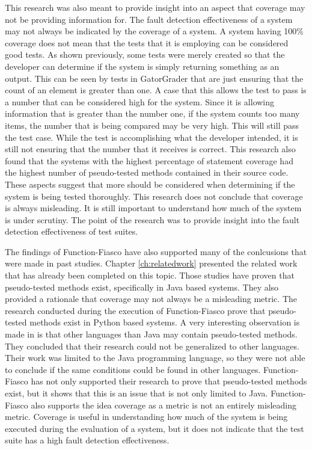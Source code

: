 This research was also meant to provide insight into an aspect that coverage may not be providing information for. The fault detection effectiveness of a system may not always be indicated by the coverage of a system. A system having 100\% coverage does not mean that the tests that it is employing can be considered good tests. As shown previously, some tests were merely created so that the developer can determine if the system is simply returning something as an output. This can be seen by tests in GatorGrader that are just ensuring that the count of an element is greater than one. A case that this allows the test to pass is a number that can be considered high for the system. Since it is allowing information that is greater than the number one, if the system counts too many items, the number that is being compared may be very high. This will still pass the test case. While the test is accomplishing what the developer intended, it is still not ensuring that the number that it receives is correct. This research also found that the systems with the highest percentage of statement coverage had the highest number of pseudo-tested methods contained in their source code. These aspects suggest that more should be considered when determining if the system is being tested thoroughly. This research does not conclude that coverage is always misleading. It is still important to understand how much of the system is under scrutiny. The point of the research was to provide insight into the fault detection effectiveness of test suites.

The findings of Function-Fiasco have also supported many of the conlcusions that were made in past studies. Chapter \ref{ch:relatedwork} presented the related work that has already been completed on this topic. Those studies have proven that pseudo-tested methods exist, specifically in Java based systems. They also provided a rationale that coverage may not always be a misleading metric. The research conducted during the execution of Function-Fiasco prove that pseudo-tested methods exist in Python based systems. A very interesting observation is made in \cite{vera2017comprehensive} is that other languages than Java may contain pseudo-tested methods. They concluded that their research could not be generalized to other languages. Their work was limited to the Java programming language, so they were not able to conclude if the same conditions could be found in other languages. Function-Fiasco has not only supported their research to prove that pseudo-tested methods exist, but it shows that this is an issue that is not only limited to Java. Function-Fiasco also supports the idea coverage as a metric is not an entirely misleading metric. Coverage is useful in understanding how much of the system is being executed during the evaluation of a system, but it does not indicate that the test suite has a high fault detection effectiveness.

